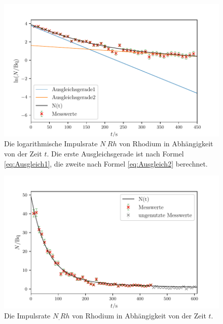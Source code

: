 \begin{figure}
	\centering
	\includegraphics[width=\linewidth-50pt,height=\textheight-50pt,keepaspectratio]{content/images/RhodiumLog3.pdf}
	\caption{Die logarithmische Impulsrate $N_.{Rh}$ von Rhodium in Abhängigkeit von der Zeit $t$. Die erste Ausgleichsgerade ist nach Formel \eqref{eq:Ausgleich1}, die zweite nach Formel \eqref{eq:Ausgleich2} berechnet.}
	\label{fig:RhodiumLog3}
\end{figure}

\begin{figure}
	\centering
	\includegraphics[width=\linewidth-50pt,height=\textheight-50pt,keepaspectratio]{content/images/Rhodium.pdf}
	\caption{Die Impulsrate $N_.{Rh}$ von Rhodium in Abhängigkeit von der Zeit $t$.}
	\label{fig:Rhodium}
\end{figure}
